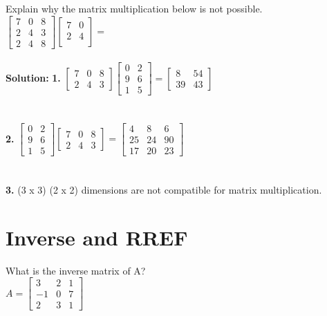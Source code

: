 \documentclass{article}
\begin{document}
Explain why the matrix multiplication below is not possible.\\
$\begin{bmatrix}
7 & 0 & 8\\
2 & 4 & 3 \\
2 & 4 & 8
\end{bmatrix} 
\begin{bmatrix}
7 & 0 \\
2 & 4  \\
\end{bmatrix} 
=$ \\\\
\textbf{Solution: }
\textbf{1. }$\begin{bmatrix}
7 & 0 & 8\\
2 & 4 & 3
\end{bmatrix}
\begin{bmatrix}
0 & 2 \\
9 & 6 \\
1 & 5
\end{bmatrix} = \begin{bmatrix}
8 & 54 \\
39 & 43
\end{bmatrix}$\\\\\\
\textbf{2. }$\begin{bmatrix}
0 & 2 \\
9 & 6 \\
1 & 5
\end{bmatrix}
\begin{bmatrix}
7 & 0 & 8\\
2 & 4 & 3
\end{bmatrix} = \begin{bmatrix}
4 & 8 & 6 \\
25 & 24 & 90\\
17 & 20 & 23
\end{bmatrix}$\\\\\\
\textbf{3. } (3 x 3) (2 x 2) dimensions are not compatible for matrix multiplication.

\section{Inverse and RREF}
What is the inverse matrix of A?\\
$A=
\begin{bmatrix}
3 & 2 & 1\\
-1 & 0 & 7 \\
2 & 3 & 1
\end{bmatrix}$\\\\ 
\end{document}
